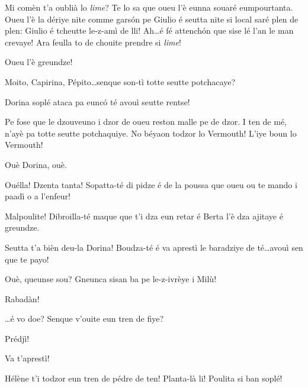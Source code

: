 \begin{drama}
\Bertaspeaks{} Mi comèn t'a oublià lo \textit{lime}? Te lo sa que oueu l'è eunna souaré eumpourtanta. Oueu l'è la dériye nite comme gars\'on pe Giulio é seutta nite si local saré plen de plen: Giulio é tcheutte le-z-amì de lli! Ah\ldots é fé attench\'on que sise lé l'an le man crevaye! Ara feulla to de chouite prendre si \textit{lime}!


\Dorinaspeaks{} Oueu l'è greundze!

\Dorinaspeaks{} Moito, Capirina, Pépito\ldots senque son-tì totte seutte potchacaye?

\Bertaspeaks Dorina soplé ataca pa eunc\'o té avouì seutte rentse!

\Dorinaspeaks Pe fose que le dzouveuno i dzor de oueu reston malle pe de dzor.  I ten de mé, n'ayè pa totte seutte po\-tchaquiye. No béyaon todzor lo Vermouth! L'iye boun lo Vermouth!


\Bertaspeaks{} Ouè Dorina, ouè.


\Djspeaks {} Ouélla! Dzenta tanta! Sopatta-té di pidze é de la poussa que oueu ou te mando i paadì o a l'enfeur!

\Dorinaspeaks Malpoulite! Dibroilla-té maque que t'i dza eun retar é Ber\-ta l’è dza ajitaye é greundze.

\Bertaspeaks Seutta t'a bièn deu-la Dorina!   Boudza-té é va aprestì le baradziye de té\ldots avouì sen que te payo!

\Djspeaks Ouè, queunse sou? Gneunca sisan ba pe le-z-ivrèye i Milù!

\Bertaspeaks Rabadàn!

\Bertaspeaks{} \ldots é vo doe? Senque v'ouite eun tren de fiye?

\Helenespeaks Prédjì!

\Bertaspeaks{} Va t'aprestì!


\Bertaspeaks Hélène t'i todzor eun tren de pédre de ten! Planta-là li! Poulita si ban soplé!


\end{drama}
